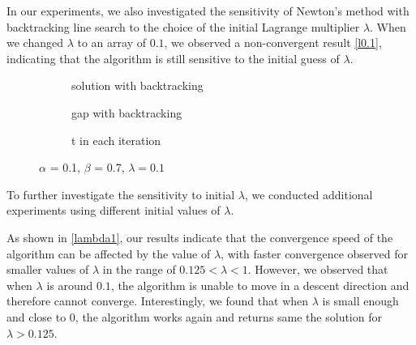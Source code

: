 \documentclass[10pt,a4paper,notitlepage,twocolumn]{article}
\begin{document}
In our experiments, we also investigated the sensitivity of Newton's method with backtracking line search to the choice of the initial Lagrange multiplier $\lambda$. When we changed $\lambda$ to an array of $0.1$, we observed a non-convergent result \autoref{l0.1}, indicating that the algorithm is still sensitive to the initial guess of $\lambda$.

\begin{figure}[htbp]
    \centering
    \begin{subfigure}[b]{0.4\textwidth}
    
    \caption{solution with backtracking}
    \label{fig:my_label}
    \end{subfigure}
    \hfill
    \begin{subfigure}[b]{0.4\textwidth}  
    
    \caption{gap with backtracking}
    \label{fig:my_label}
    \end{subfigure}
    \hfill
    \begin{subfigure}[b]{0.4\textwidth}  
    
    \caption{t in each iteration}
    \label{fig:my_label}
    \end{subfigure}
    \caption{$\alpha$ = 0.1, $\beta$ = 0.7, $\lambda = 0.1$}
    \label{l0.1}
\end{figure}

To further investigate the sensitivity to initial $\lambda$, we conducted additional experiments using different initial values of $\lambda$. 

As shown in \autoref{lambda1}, our results indicate that the convergence speed of the algorithm can be affected by the value of $\lambda$, with faster convergence observed for smaller values of $\lambda$ in the range of $0.125 < \lambda < 1$. However, we observed that when $\lambda$ is around $0.1$, the algorithm is unable to move in a descent direction and therefore cannot converge. Interestingly, we found that when $\lambda$ is small enough and close to $0$, the algorithm works again and returns same the solution for $\lambda > 0.125$.
\end{document}
